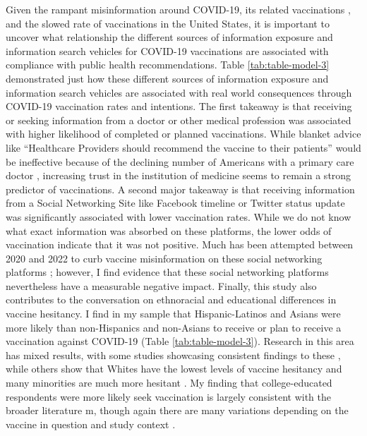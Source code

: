 Given the rampant misinformation around COVID-19, its related vaccinations
\citep{pathakInfodemicsCOVID19Role2020, mottaHowRightLeaningMedia2020, shahsavariConspiracyTimeCorona2020},
and the slowed rate of vaccinations in the
United States, it is important to uncover what relationship the different
sources of information exposure and information search vehicles for COVID-19 vaccinations
are associated with compliance with public health recommendations. Table
\ref{tab:table-model-3} demonstrated just how these different sources of information 
exposure and information search vehicles are associated with real world
consequences through COVID-19 vaccination rates and intentions. The first
takeaway is that receiving or seeking information from a doctor or other medical
profession was associated with higher likelihood of completed or planned vaccinations.
While blanket advice like ``Healthcare Providers should recommend the vaccine to
their patients'' would be ineffective because of the declining number of
Americans with a primary care doctor \citep{levine_etal20}, increasing trust in the
institution of medicine seems to remain a strong predictor of vaccinations.
A second major takeaway is that receiving information from a Social Networking
Site like Facebook timeline or Twitter status update was significantly
associated with lower vaccination rates. While we do not know what exact
information was absorbed on these platforms, the lower odds of vaccination
indicate that it was not positive. Much has been attempted between 2020 and 2022
to curb vaccine misinformation on these social networking platforms 
\citep[see][for an early example]{bowman20}; however, I find evidence that these social
networking platforms nevertheless have a measurable negative impact. Finally,
this study also contributes to the conversation on ethnoracial and
educational differences in vaccine hesitancy. I find in my sample that
Hispanic-Latinos and Asians were more likely than non-Hispanics and non-Asians
to receive or plan to receive a vaccination against COVID-19 (Table
\ref{tab:table-model-3}). Research in this area has mixed results, with some
studies showcasing consistent findings to these \citep{bagasra_etal21,king_etal21},
while others show that Whites have the lowest levels of vaccine hesitancy and
many minorities are much more hesitant \citep{momplaisir_etal21, foxworth21}. 
My finding that college-educated respondents were more likely seek vaccination is 
largely consistent with the broader literature m\citep{khairat_etal22}, though 
again there are many variations depending on the vaccine
in question and study context \citep{siddiqui_etal13}.

